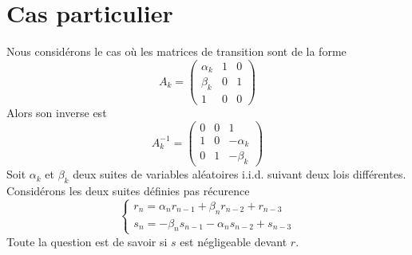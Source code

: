 \documentclass[12pt]{article}
\theoremstyle{plain}%
\theoremstyle{definition}
\theoremstyle{remark}
\begin{document}
\section{Cas particulier}
Nous considérons le cas où les matrices de transition sont de la forme $$
A_k=\begin{pmatrix}
\alpha_k & 1 & 0 \\
\beta_k & 0 & 1 \\
1 & 0 & 0
\end{pmatrix}
$$
Alors son inverse est $$
A_k^{-1}=\begin{pmatrix}
0 & 0 & 1 \\
1 & 0 & - \alpha_k \\
0 & 1 & - \beta_k
\end{pmatrix}
$$
Soit $\alpha_k$ et $\beta_k$ deux suites de variables aléatoires i.i.d. suivant deux lois différentes. Considérons les deux suites définies pas récurence $$
\left \{
\begin{array}{l}
r_{n}=\alpha_n r_{n-1} + \beta_n r_{n-2} + r_{n-3}\\
s_{n}= - \beta_n s_{n-1} - \alpha_n s_{n-2} + s_{n-3}
\end{array}
\right .
$$
Toute la question est de savoir si $s$ est négligeable devant $r$.
\end{document}
